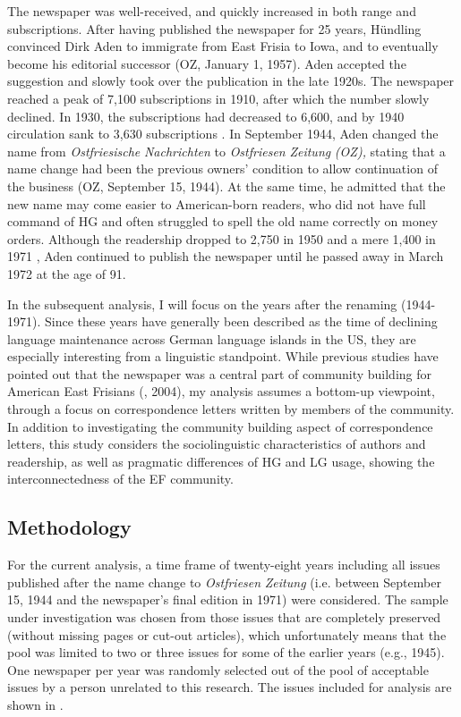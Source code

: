 \documentclass[output=paper]{langsci/langscibook}
\begin{document}
The newspaper was well-received, and quickly increased in both range and subscriptions. After having published the newspaper for 25 years, Hündling convinced Dirk Aden to immigrate from East Frisia to Iowa, and to eventually become his editorial successor (OZ, January 1, 1957). Aden accepted the suggestion and slowly took over the publication in the late 1920s. The newspaper reached a peak of 7,100 subscriptions in 1910, after which the number slowly declined. In 1930, the subscriptions had decreased to 6,600, and by 1940 circulation sank to 3,630 subscriptions \citep[79]{Lindaman2004}. In September 1944, Aden changed the name from \textit{Ostfriesische} \textit{Nachrichten} to \textit{Ostfriesen} \textit{Zeitung} \textit{(OZ),} stating that a name change had been the previous owners’ condition to allow continuation of the business (OZ, September 15, 1944). At the same time, he admitted that the new name may come easier to American-born readers, who did not have full command of HG and often struggled to spell the old name correctly on money orders. Although the readership dropped to 2,750 in 1950 \citep[79]{Lindaman2004} and a mere 1,400 in 1971 \citep{Monahan1971}, Aden continued to publish the newspaper until he passed away in March 1972 at the age of 91.

In the subsequent analysis, I will focus on the years after the renaming (1944-1971). Since these years have generally been described as the time of declining language maintenance across German language islands in the US, they are especially interesting from a linguistic standpoint. While previous studies have pointed out that the newspaper was a central part of community building for American East Frisians (\citealt{Lindaman2002}, 2004), my analysis assumes a bottom-up viewpoint, through a focus on correspondence letters written by members of the community. In addition to investigating the community building aspect of correspondence letters, this study considers the sociolinguistic characteristics of authors and readership, as well as pragmatic differences of HG and LG usage, showing the interconnectedness of the EF community.

\subsection{Methodology} %
\label{sec:rocker:}

For the current analysis, a time frame of twenty-eight years including all issues published after the name change to \textit{Ostfriesen} \textit{Zeitung} (i.e. between September 15, 1944 and the newspaper’s final edition in 1971) were considered. The sample under investigation was chosen from those issues that are completely preserved (without missing pages or cut-out articles), which unfortunately means that the pool was limited to two or three issues for some of the earlier years (e.g., 1945). One newspaper per year was randomly selected out of the pool of acceptable issues by a person unrelated to this research. The issues included for analysis are shown in . 
 
\end{document}
